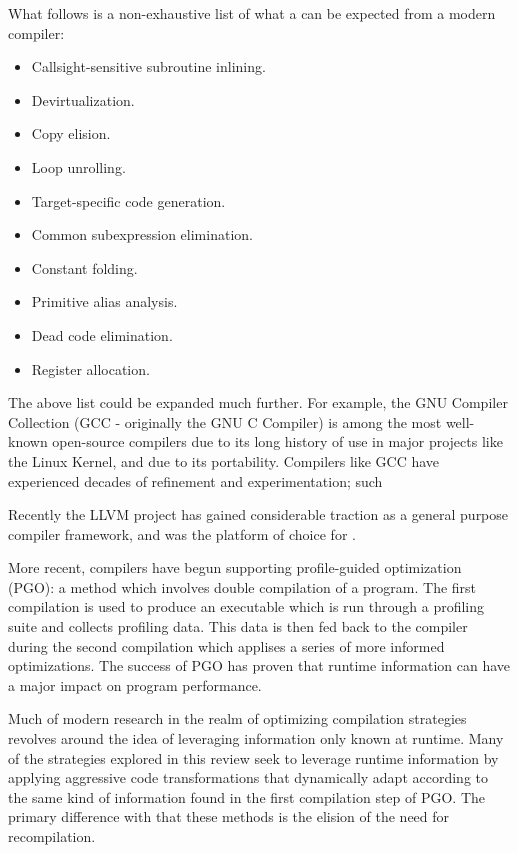\documentclass[nobib]{tufte-handout}
\newcommand{\placeholdertext}[1]{
	\noindent{\color{red}{#1}}
}
\begin{document}
What follows is a non-exhaustive list of what a can be expected from a modern compiler:
\begin{itemize}
\item Callsight-sensitive subroutine inlining.
\item Devirtualization. 
\item Copy elision.
\item Loop unrolling. 
\item Target-specific code generation.  
\item Common subexpression elimination.
\item Constant folding.
\item Primitive alias analysis. 
\item Dead code elimination.
\item Register allocation.
\end{itemize}

The above list could be expanded much further.  For example, the GNU Compiler Collection (GCC - originally the GNU C Compiler) is among the most well-known open-source compilers due to its long history of use in major projects like the Linux Kernel, and due to its portability.  Compilers like GCC have experienced decades of refinement and experimentation; such 

Recently the LLVM project has gained considerable traction as a general purpose compiler framework, and was the platform of choice for \placeholdertext{(list of sources that used LLVM to implement their experiments)}.  

More recent, compilers have begun supporting profile-guided optimization (PGO): a method which involves double compilation of a program.  The first compilation is used to produce an executable which is run through a profiling suite and collects profiling data.  This data is then fed back to the compiler during the second compilation which applises a series of more informed optimizations.  The success of PGO has proven that runtime information can have a major impact on program performance.

Much of modern research in the realm of optimizing compilation strategies revolves around the idea of leveraging information only known at runtime.  Many of the strategies explored in this review seek to leverage runtime information by applying aggressive code transformations that dynamically adapt according to the same kind of information found in the first compilation step of PGO.  The primary difference with that these methods is the elision of the need for recompilation.  
\end{document}
